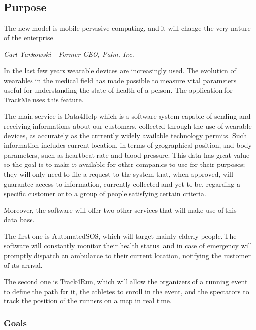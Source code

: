 \documentclass[../main.tex]{subfiles}
\begin{document}
\subsection{Purpose}

\epigraph{The new model is mobile pervasive computing, and it will change the very nature of the enterprise}{\textit{Carl Yankowski - Former CEO, Palm, Inc.}}

In the last few years wearable devices are increasingly used. The evolution of wearables in the medical field has made possible to measure vital parameters useful for understanding the state of health of a person. The application for TrackMe uses this feature.

The main service is Data4Help which is a software system capable of sending and receiving informations about our customers, collected through the use of wearable devices, as accurately as the currently widely available technology permits. Such information includes current location, in terms of geographical position, and body parameters, such as heartbeat rate and blood pressure.
This data has great value so the goal is to make it available for other companies to use for their purposes; they will only need to file a request to the system that, when approved, will guarantee access to information, currently collected and yet to be, regarding a specific customer or to a group of people satisfying certain criteria.

Moreover, the software will offer two other services that will make use of this data base.

The first one is AutomatedSOS, which will target mainly elderly people. The software will constantly monitor their health status, and in case of emergency will promptly dispatch an ambulance to their current location, notifying the customer of its arrival.

The second one is Track4Run, which will allow the organizers of a running event to define the path for it, the athletes to enroll in the event, and the spectators to track the position of the runners on a map in real time.

\subsubsection{Goals}
\end{document}
